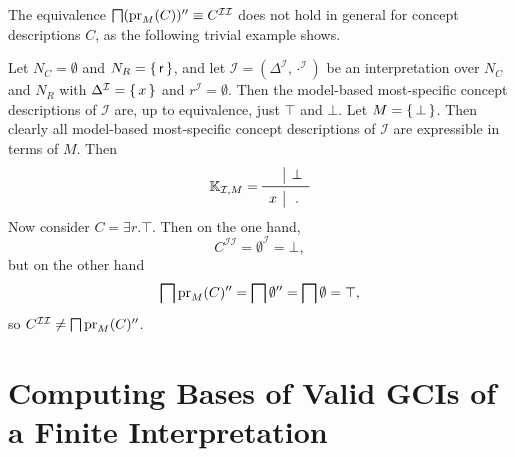 The equivalence $\bigsqcap (\operatorname{pr}_M(C))'' \equiv C^{\mathcal{I}\mathcal{I}}$ does not hold
in general for concept descriptions $C$, as the following trivial example shows.

\begin{Example}
  \label{expl:counterexample}
  Let $N_C = \emptyset$ and $N_R = {\{\, \mathsf{r} \,\}}$, and let $\mathcal{I} =
  (\Delta^{\mathcal{I}}, \cdot^{\mathcal{I}})$ be an interpretation over $N_C$ and $N_R$
  with $\Delta^{\mathcal{I}} = {\{\, x \,\}}$ and $r^{\mathcal{I}} = \emptyset$.  Then the
  model-based most-specific concept descriptions of $\mathcal{I}$ are, up to equivalence,
  just $\top$ and $\bot$.  Let $M = {\{\, \bot \,\}}$.  Then clearly all model-based
  most-specific concept descriptions of $\mathcal{I}$ are expressible in terms of $M$.
  Then
  \begin{equation*}
    \con K_{\mathcal{I}, M} =
    \begin{array}{c|c}
      ~ & \bot \\\midrule
      x & . \\
    \end{array}
  \end{equation*}
  Now consider $C = \exists r. \top$.  Then on the one hand,
  \begin{equation*}
    C^{\mathcal{I}\mathcal{I}} = \emptyset^{\mathcal{I}} = \bot,
  \end{equation*}
  but on the other hand
  \begin{equation*}
    \bigsqcap \operatorname{pr}_M(C)'' = \bigsqcap \emptyset'' = \bigsqcap \emptyset = \top,
  \end{equation*}
  so $C^{\mathcal{I}\mathcal{I}} \neq \bigsqcap \operatorname{pr}_M(C)''$.
\end{Example}

\section{Computing Bases of Valid GCIs of a Finite Interpretation}
\label{sec:base-all-valid}


%
%
%
%
%



